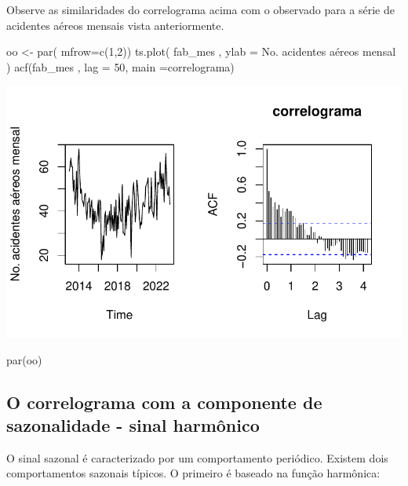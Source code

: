 \documentclass[
  letterpaper,
  DIV=11,
  numbers=noendperiod]{scrreprt}
\newenvironment{Shaded}{\begin{snugshade}}{\end{snugshade}}
\newcommand{\AttributeTok}[1]{\textcolor[rgb]{0.40,0.45,0.13}{#1}}
\newcommand{\DecValTok}[1]{\textcolor[rgb]{0.68,0.00,0.00}{#1}}
\newcommand{\FunctionTok}[1]{\textcolor[rgb]{0.28,0.35,0.67}{#1}}
\newcommand{\NormalTok}[1]{\textcolor[rgb]{0.00,0.23,0.31}{#1}}
\newcommand{\OtherTok}[1]{\textcolor[rgb]{0.00,0.23,0.31}{#1}}
\newcommand{\StringTok}[1]{\textcolor[rgb]{0.13,0.47,0.30}{#1}}
\begin{document}
Observe as similaridades do correlograma acima com o observado para a
série de acidentes aéreos mensais vista anteriormente.

\begin{Shaded}
\begin{Highlighting}[]
\NormalTok{oo }\OtherTok{\textless{}{-}} \FunctionTok{par}\NormalTok{( }\AttributeTok{mfrow=}\FunctionTok{c}\NormalTok{(}\DecValTok{1}\NormalTok{,}\DecValTok{2}\NormalTok{))}
\FunctionTok{ts.plot}\NormalTok{( fab\_mes , }\AttributeTok{ylab =} \StringTok{\textquotesingle{}No. acidentes aéreos mensal\textquotesingle{}}\NormalTok{ )}
\FunctionTok{acf}\NormalTok{(fab\_mes , }\AttributeTok{lag =} \DecValTok{50}\NormalTok{,  }\AttributeTok{main =}\StringTok{\textquotesingle{}correlograma\textquotesingle{}}\NormalTok{)}
\end{Highlighting}
\end{Shaded}

\includegraphics{sinal_files/figure-pdf/unnamed-chunk-7-1.pdf}

\begin{Shaded}
\begin{Highlighting}[]
\FunctionTok{par}\NormalTok{(oo)}
\end{Highlighting}
\end{Shaded}

\subsection{O correlograma com a componente de sazonalidade - sinal
harmônico}\label{o-correlograma-com-a-componente-de-sazonalidade---sinal-harmuxf4nico}

O sinal sazonal é caracterizado por um comportamento periódico. Existem
dois comportamentos sazonais típicos. O primeiro é baseado na função
harmônica:
\end{document}
